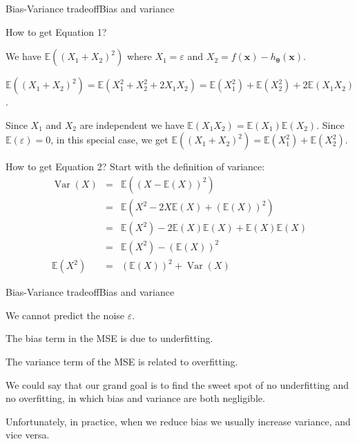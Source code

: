 \documentclass{beamer}
\renewcommand{\vec}[1]{\boldsymbol{#1}}
\def\Expec{\mathbb{E}}
\DeclareMathOperator*{\var}{Var}
\begin{document}
\begin{frame}{Bias-Variance tradeoff}{Bias and variance}

  How to get Equation 1?

  \medskip

  We have $\Expec((X_1+X_2)^2)$ where $X_1 = \varepsilon$ and $X_2 =
  f(\vec{x})-h_{\vec{\theta}}(\vec{x})$.

  \medskip

  $\Expec((X_1+X_2)^2) = \Expec(X_1^2+X_2^2+2X_1X_2) =
  \Expec(X_1^2)+\Expec(X_2^2)+2\Expec(X_1X_2)$.

  \medskip
  
  Since $X_1$ and $X_2$ are independent we have $\Expec(X_1X_2) =
  \Expec(X_1)\Expec(X_2)$. Since $\Expec(\varepsilon) = 0$, in this
  special case, we get $\Expec((X_1+X_2)^2) =
  \Expec(X_1^2)+\Expec(X_2^2)$.

  \medskip

  How to get Equation 2? Start with the definition of variance:
  \begin{eqnarray*}
    \var(X) & = & \Expec((X-\Expec(X))^2) \\
            & = & \Expec(X^2-2X\Expec(X)+(\Expec(X))^2) \\
            & = & \Expec(X^2)-2\Expec(X)\Expec(X)+\Expec(X)\Expec(X) \\
            & = & \Expec(X^2) - (\Expec(X))^2 \\
    \Expec(X^2) & = & (\Expec(X))^2 + \var(X)
  \end{eqnarray*}
    
\end{frame}


\begin{frame}{Bias-Variance tradeoff}{Bias and variance}

  We cannot predict the \alert{noise} $\varepsilon$.

  \medskip

  The \alert{bias} term in the MSE is due to \alert{underfitting}.

  \medskip

  The \alert{variance} term of the MSE is related to \alert{overfitting}.

  \medskip

  We could say that our grand goal is to find the \alert{sweet spot} of no
  underfitting and no overfitting, in which bias and variance are both
  negligible.

  \medskip

  Unfortunately, in practice, when we reduce bias we usually increase
  variance, and vice versa.
  
\end{frame}
\end{document}
